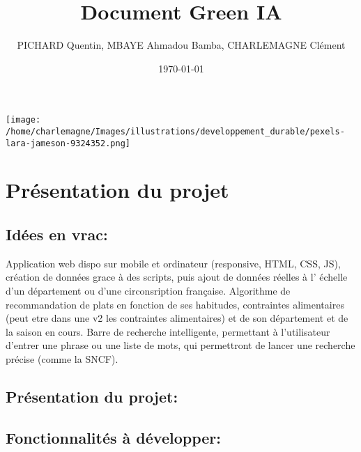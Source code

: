 \documentclass[11pt]{article}
\title{Document Green IA}
\author{PICHARD Quentin, MBAYE Ahmadou Bamba, CHARLEMAGNE Clément}
\date{\today}
\begin{document}
\maketitle

\begin{center}
    \texttt{[image: /home/charlemagne/Images/illustrations/developpement\_durable/pexels-lara-jameson-9324352.png]}
\end{center}

\section{\textcolor{section}{Présentation du projet}}
\subsection*{\textcolor{sub_section}{Idées en vrac:}}
Application web dispo sur mobile et ordinateur (responsive, HTML, CSS, JS),
création de données grace à des scripts, puis ajout de données réelles à l'
échelle d'un département ou d'une circonsription française. Algorithme de recommandation 
de plats en fonction de ses habitudes, contraintes alimentaires (peut etre dans une v2 les 
contraintes alimentaires) et de son département et de la saison en cours. Barre de recherche 
intelligente, permettant à l'utilisateur d'entrer une phrase ou une liste de mots, qui 
permettront de lancer une recherche précise (comme la SNCF). 

\subsection*{\textcolor{sub_section}{Présentation du projet:}}

\subsection*{\textcolor{sub_section}{Fonctionnalités à développer:}}
\end{document}
